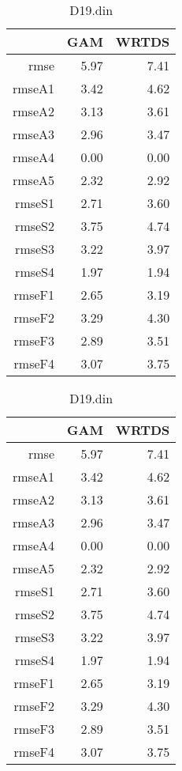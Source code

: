 \documentclass[12pt]{amsart}
\begin{document}
\begin{table}[H]
\centering
\begin{tabular}{rrr}
  \hline
 & GAM & WRTDS \\ 
  \hline
rmse & 5.97 & 7.41 \\ 
  rmseA1 & 3.42 & 4.62 \\ 
  rmseA2 & 3.13 & 3.61 \\ 
  rmseA3 & 2.96 & 3.47 \\ 
  rmseA4 & 0.00 & 0.00 \\ 
  rmseA5 & 2.32 & 2.92 \\ 
  rmseS1 & 2.71 & 3.60 \\ 
  rmseS2 & 3.75 & 4.74 \\ 
  rmseS3 & 3.22 & 3.97 \\ 
  rmseS4 & 1.97 & 1.94 \\ 
  rmseF1 & 2.65 & 3.19 \\ 
  rmseF2 & 3.29 & 4.30 \\ 
  rmseF3 & 2.89 & 3.51 \\ 
  rmseF4 & 3.07 & 3.75 \\ 
   \hline
\end{tabular}
\caption{D19.din}
\end{table}

\begin{table}[H]
\centering
\begin{tabular}{rrr}
  \hline
 & GAM & WRTDS \\ 
  \hline
rmse & 5.97 & 7.41 \\ 
  rmseA1 & 3.42 & 4.62 \\ 
  rmseA2 & 3.13 & 3.61 \\ 
  rmseA3 & 2.96 & 3.47 \\ 
  rmseA4 & 0.00 & 0.00 \\ 
  rmseA5 & 2.32 & 2.92 \\ 
  rmseS1 & 2.71 & 3.60 \\ 
  rmseS2 & 3.75 & 4.74 \\ 
  rmseS3 & 3.22 & 3.97 \\ 
  rmseS4 & 1.97 & 1.94 \\ 
  rmseF1 & 2.65 & 3.19 \\ 
  rmseF2 & 3.29 & 4.30 \\ 
  rmseF3 & 2.89 & 3.51 \\ 
  rmseF4 & 3.07 & 3.75 \\ 
   \hline
\end{tabular}
\caption{D19.din}
\end{table}
\end{document}
